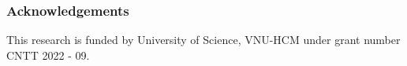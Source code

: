 \documentclass[runningheads]{llncs}
\begin{document}
\subsubsection*{Acknowledgements} This research is funded by University of Science, VNU-HCM under grant number CNTT 2022 - 09.
\clearpage
%
%


\clearpage





\end{document}
